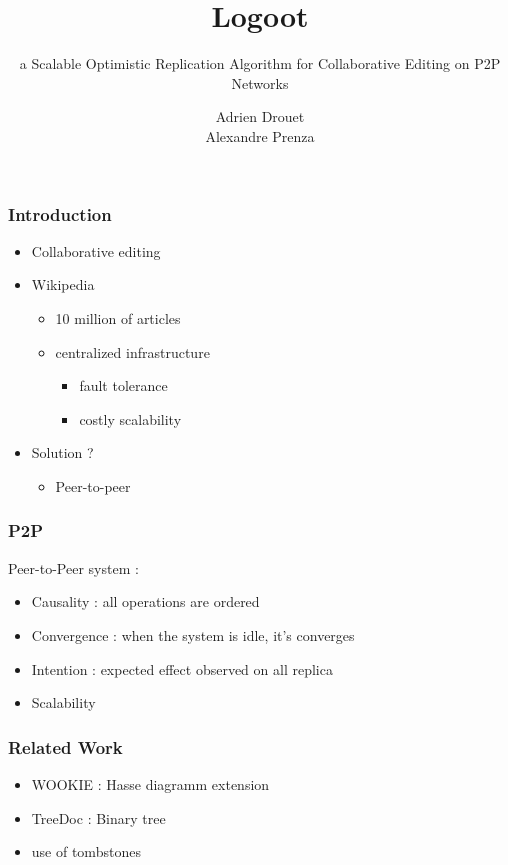 \documentclass[14pt]{beamer}
\title{Logoot}
\subtitle{a Scalable Optimistic Replication Algorithm for Collaborative Editing on P2P Networks}
\author{Adrien Drouet\\
        Alexandre Prenza}
\begin{document}
  \begin{frame}
    \titlepage
  \end{frame}

	\begin{frame}
		\frametitle{Introduction}
		\begin{itemize}
			\item<1-> Collaborative editing
			\item <2->Wikipedia
				\begin{itemize}
					\item<3-> 10 million of articles
					\item<3-> centralized infrastructure
					\begin{itemize}
						\item<4-> fault tolerance
						\item<4-> costly scalability
					\end{itemize}
				\end{itemize}
			\item<5-> Solution ?
			\begin{itemize}
						\item<6-> Peer-to-peer
			\end{itemize}
		\end{itemize}
	\end{frame}

	\begin{frame}
		\frametitle{P2P}
		Peer-to-Peer system :
		\begin{itemize}
			\item<2-> Causality : all operations are ordered
			\item<2-> Convergence : when the system is idle, it's converges
			\item<2-> Intention : expected effect observed on all replica
			\item<2-> Scalability
		\end{itemize}
	\end{frame}

	\begin{frame}
	  \frametitle{Related Work}
		\begin{itemize}
			\item<1-> WOOKIE : Hasse diagramm extension
			\item<1-> TreeDoc : Binary tree
			\item<2-> use of tombstones
		\end{itemize}
	\end{frame}
\end{document}
